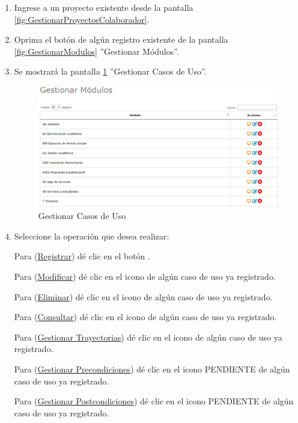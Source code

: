 			\begin{enumerate}
				
			\item Ingrese a un proyecto existente desde la pantalla \ref{fig:GestionarProyectosColaborador}.
			
			\item Oprima el botón \IUCU{} de algún registro existente de la pantalla \ref{fig:GestionarModulos} ''Gestionar Módulos''.
	
			\item Se mostrará la pantalla \ref{fig:GestionarCU} ''Gestionar Casos de Uso''.

			\begin{figure}[htbp!]
				\begin{center}
					\includegraphics[scale=0.6]{roles/lider/casosUso/pantallas/IU5gestionarModulos}
					\caption{Gestionar Casos de Uso}
					\label{fig:GestionarCU}
				\end{center}
			\end{figure}
		
				\item Seleccione la operación que desea realizar:
			
			Para (\hyperlink{cv:registrarCU}{Registrar}) dé clic en el botón \IURegistrar.
			
			Para (\hyperlink{cv:modificarCU}{Modificar}) dé clic en el icono \IUEditar{} de algún caso de uso ya registrado.
			
			Para (\hyperlink{cv:eliminarCU}{Eliminar}) dé clic en el icono \IUBotonEliminar{} de algún caso de uso ya registrado.
			
			Para (\hyperlink{cv:consultarCU}{Consultar}) dé clic en el icono \IUConsultar{} de algún caso de uso ya registrado.
			
			Para (\hyperlink{cv:GestionarTray}{Gestionar Trayectorias}) dé clic en el icono \IUTray{} de algún caso de uso ya registrado.
			
			Para (\hyperlink{cv:GestionarPrecondiciones}{Gestionar Precondiciones}) dé clic en el icono PENDIENTE de algún caso de uso ya registrado.
			
			Para (\hyperlink{cv:GestionarTray}{Gestionar Postcondiciones}) dé clic en el icono PENDIENTE de algún caso de uso ya registrado.
			\end{enumerate}